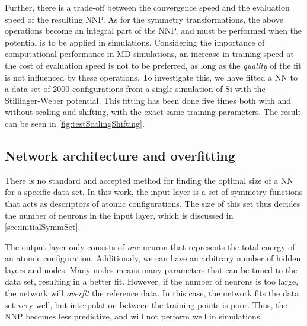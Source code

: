 \documentclass[twoside,english]{uiofysmaster}
\begin{document}
Further, there is a trade-off between the convergence speed and the evaluation speed of the resulting NNP. 
As for the symmetry transformations, the above operations become an integral part of the NNP, and must be performed 
when the potential is to be applied in simulations. Considering the importance of computational performance in MD simulations,
an increase in training speed at the cost of evaluation speed is not to be preferred, as long as the \textit{quality} of the fit 
is not influenced by these operations. To investigate this, we have fitted a NN to a data set of 2000 configurations
from a single simulation of Si with the Stillinger-Weber potential. This fitting has been done five times both with and without 
scaling and shifting, with the exact same training parameters. The result can be seen in \autoref{fig:testScalingShifting}. 


\subsection{Network architecture and overfitting}
There is no standard and accepted method for finding the optimal size of a NN for a specific data set. 
In this work, the input layer is a set of symmetry functions that acts as descriptors of atomic configurations.
The size of this set thus decides the number of neurons in the input layer, which is discussed in \autoref{sec:initialSymmSet}. 

The output layer only consists of \textit{one} neuron that represents the total energy of an atomic 
configuration. Additionaly, we can have an arbitrary number of hidden layers and nodes. 
Many nodes means many parameters that can be tuned to the data set, resulting in a better fit.
However, if the number of neurons is too large, the network will \textit{overfit} the reference data. 
In this case, the network fits the data set very well, but interpolation between the training points is poor. Thus, 
the NNP becomes less predictive, and will not perform well in simulations.
\end{document}
